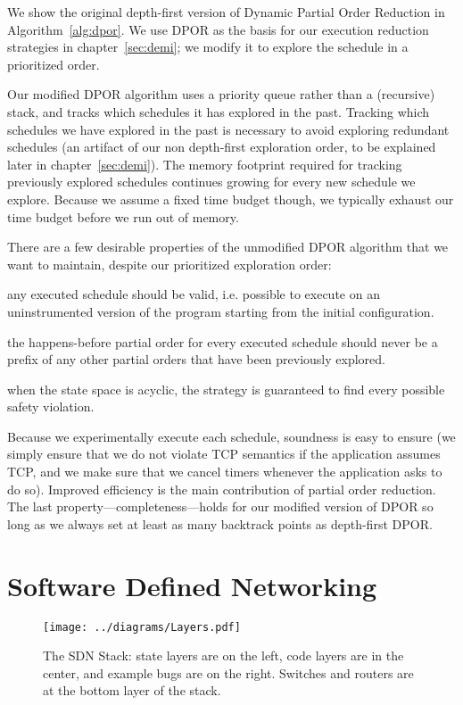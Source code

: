 We show the original depth-first version of Dynamic Partial Order Reduction
in Algorithm~\ref{alg:dpor}. We use DPOR as the basis for our execution
reduction strategies in chapter~\ref{sec:demi}; we modify it to explore the schedule in a
prioritized order.

Our modified DPOR algorithm uses a priority queue
rather than a (recursive) stack, and tracks which schedules it has explored
in the past. Tracking which schedules we have explored in the past is
necessary to avoid exploring redundant schedules (an artifact of our non depth-first
exploration order, to be explained later in chapter~\ref{sec:demi}). The memory footprint required for tracking previously explored
schedules continues growing for every new schedule we explore. Because we
assume a fixed time budget though,
we typically exhaust our time budget before we run out of memory.

There are a few desirable properties of the unmodified DPOR algorithm that we want to maintain,
despite our prioritized exploration order:

 any executed schedule should be valid, i.e. possible
to execute on an uninstrumented version of the program starting from the
initial configuration.

 the happens-before partial order for every executed schedule
should never be a prefix of any other partial orders that have been
previously explored.

 when the state space is acyclic, the strategy is guaranteed to
find every possible safety violation.

Because we experimentally execute each schedule, soundness is easy to
ensure (we simply ensure that we do not violate TCP semantics if the application
assumes TCP, and we make sure that
we cancel timers whenever the application asks to do so).
Improved efficiency is the main contribution of partial order reduction. The last
property---completeness---holds for our modified version of DPOR so long as we
always set at least as many backtrack points as depth-first
DPOR.


\section{Software Defined Networking}
\label{sec:sdn}

\begin{figure}[ht!]
\centering
\texttt{[image: ../diagrams/Layers.pdf]}
\caption{The SDN Stack: state layers are on the left, code layers are in the
center, and example bugs are on the right. Switches and routers are at the
bottom layer of the stack.}
\label{fig:layers}
\end{figure}

